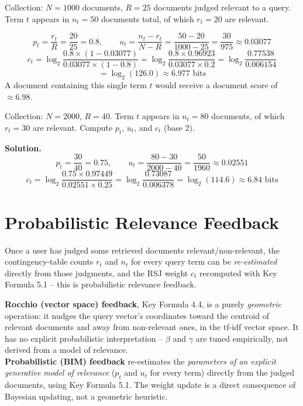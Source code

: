\documentclass[11pt, a4paper]{article}
\newcommand{\Solution}{\medskip\noindent\textbf{\color{exgreen}Solution.}\ }
\begin{document}
\begin{examplebox}
Collection: $N=1000$ documents, $R=25$ documents judged relevant to a query. Term $t$ appears in $n_t=50$ documents total, of which $r_t=20$ are relevant.

\[
p_t = \frac{r_t}{R} = \frac{20}{25} = 0.8, \qquad u_t = \frac{n_t-r_t}{N-R} = \frac{50-20}{1000-25} = \frac{30}{975} \approx 0.03077
\]
\[
c_t = \log_2 \frac{0.8\times(1-0.03077)}{0.03077\times(1-0.8)} = \log_2\frac{0.8\times0.96923}{0.03077\times0.2} = \log_2\frac{0.77538}{0.006154}
\]
\[
= \log_2(126.0) \approx 6.977 \text{ bits}
\]
A document containing this single term $t$ would receive a document score of $\approx6.98$.
\end{examplebox}

\begin{exercisebox}
Collection: $N=2000$, $R=40$. Term $t$ appears in $n_t=80$ documents, of which $r_t=30$ are relevant. Compute $p_t$, $u_t$, and $c_t$ (base 2).
\end{exercisebox}

\Solution
\[
p_t = \frac{30}{40} = 0.75, \qquad u_t = \frac{80-30}{2000-40} = \frac{50}{1960} \approx 0.02551
\]
\[
c_t = \log_2\frac{0.75\times0.97449}{0.02551\times0.25} = \log_2\frac{0.73087}{0.006378} = \log_2(114.6) \approx 6.84 \text{ bits}
\]

\section{Probabilistic Relevance Feedback}
\label{sec:vsm-vs-prob}

Once a user has judged some retrieved documents relevant/non-relevant, the contingency-table counts $r_t$ and $n_t$ for every query term can be \emph{re-estimated} directly from those judgments, and the RSJ weight $c_t$ recomputed with Key Formula 5.1 -- this is probabilistic relevance feedback.

\begin{defbox}
\textbf{Rocchio (vector space) feedback}, Key Formula 4.4, is a purely \emph{geometric} operation: it nudges the query vector's coordinates toward the centroid of relevant documents and away from non-relevant ones, in the tf-idf vector space. It has no explicit probabilistic interpretation -- $\beta$ and $\gamma$ are tuned empirically, not derived from a model of relevance.\\[4pt]
\textbf{Probabilistic (BIM) feedback} re-estimates the \emph{parameters of an explicit generative model of relevance} ($p_t$ and $u_t$ for every term) directly from the judged documents, using Key Formula 5.1. The weight update is a direct consequence of Bayesian updating, not a geometric heuristic.
\end{defbox}
\end{document}
